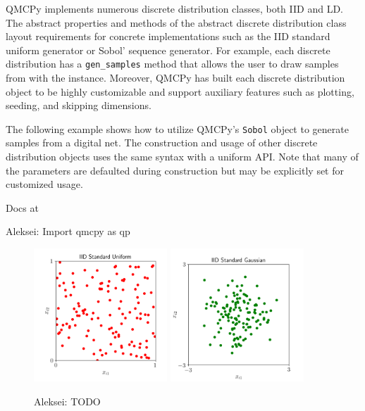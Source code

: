 \documentclass[graybox,footinfo]{svmult}
\newcommand{\AGSComment}[1]{{\color{cyan} Aleksei: #1}}
\begin{document}
QMCPy implements numerous discrete distribution classes, both IID and LD. The abstract properties and methods of the abstract discrete distribution class layout requirements for concrete implementations such as the IID standard uniform generator or Sobol' sequence generator. For example, each discrete distribution has a \texttt{gen\_samples} method that allows the user to draw samples from with the instance. Moreover, QMCPy has built each discrete distribution object to be highly customizable and support auxiliary features such as plotting, seeding, and skipping dimensions. 

The following example shows how to utilize QMCPy's \texttt{Sobol} object to generate samples from a digital net. The construction and usage of other discrete distribution objects uses the same syntax with a uniform API. Note that many of the parameters are defaulted during construction but may be explicitly set for customized usage. 

Docs at \cite{QMCPyDocs}

\AGSComment{Import qmcpy as qp}



\begin{figure}
	\includegraphics[height=5cm]{ags/figs/dd.iid_std_uniform_1.png}
	\qquad
	\includegraphics[height=5cm]{ags/figs/dd.iid_std_gaussian.png}
	\caption{\AGSComment{TODO}}
	\label{fig:dd_iid}
\end{figure}
\end{document}

